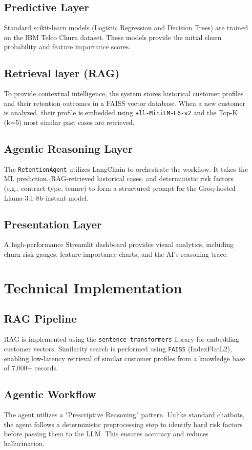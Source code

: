 \documentclass[conference]{IEEEtran}
\begin{document}
\subsection{Predictive Layer}
Standard scikit-learn models (Logistic Regression and Decision Trees) are trained on the IBM Telco Churn dataset. These models provide the initial churn probability and feature importance scores.

\subsection{Retrieval layer (RAG)}
To provide contextual intelligence, the system stores historical customer profiles and their retention outcomes in a FAISS vector database. When a new customer is analyzed, their profile is embedded using \texttt{all-MiniLM-L6-v2} and the Top-K (k=5) most similar past cases are retrieved.

\subsection{Agentic Reasoning Layer}
The \texttt{RetentionAgent} utilizes LangChain to orchestrate the workflow. It takes the ML prediction, RAG-retrieved historical cases, and deterministic risk factors (e.g., contract type, tenure) to form a structured prompt for the Groq-hosted Llama-3.1-8b-instant model.

\subsection{Presentation Layer}
A high-performance Streamlit dashboard provides visual analytics, including churn risk gauges, feature importance charts, and the AI's reasoning trace.

\section{Technical Implementation}
\subsection{RAG Pipeline}
RAG is implemented using the \texttt{sentence-transformers} library for embedding customer vectors. Similarity search is performed using \texttt{FAISS} (IndexFlatL2), enabling low-latency retrieval of similar customer profiles from a knowledge base of 7,000+ records.

\subsection{Agentic Workflow}
The agent utilizes a "Prescriptive Reasoning" pattern. Unlike standard chatbots, the agent follows a deterministic preprocessing step to identify hard risk factors before passing them to the LLM. This ensures accuracy and reduces hallucination.
\end{document}

